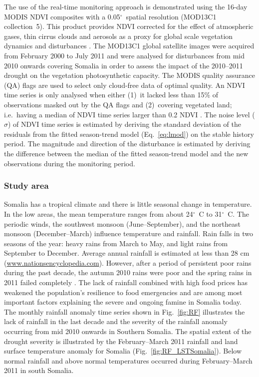\documentclass[authoryear,preprint,review,10pt]{elsarticle}
\newcommand{\degree}{\ensuremath{^\circ}}
\begin{document}
The use of the real-time monitoring approach is demonstrated using the 16-day MODIS NDVI composites with a 0.05\degree \ spatial resolution (MOD13C1 collection~5). This product provides  NDVI corrected for the effect of atmospheric gases, thin cirrus clouds and aerosols as a proxy for global scale vegetation dynamics and disturbances \citep{Huete2002}.
The MOD13C1 global satellite images were acquired from February 2000 to July 2011 and were analysed for disturbances from mid 2010 onwards covering Somalia
in order to assess the impact of the 2010--2011 drought on the vegetation photosynthetic capacity. The MODIS quality assurance (QA) flags are used to select
only cloud-free data of optimal quality. An NDVI time series is only analysed when either (1)~it lacked less than 15\% of observations masked out by the QA
flags and (2)~covering vegetated land; i.e.\ having a median of NDVI time series larger than 0.2 NDVI \citep{Beurs2009, deJong:wo, Vrieling:2011da}. The
noise level ($\sigma$) of NDVI time series is estimated by deriving the standard deviation of the residuals from the fitted season-trend model
(Eq.~\ref{eq:lmod}) on the stable history period.  The magnitude and direction of the disturbance is estimated by deriving the difference between the median
of the fitted season-trend model and the new observations during the monitoring period.

\subsubsection*{Study area}

Somalia has a tropical climate and there is little seasonal change in temperature. In the low areas, the mean temperature ranges from about 24\degree~C to 31\degree~C. The periodic winds, the southwest monsoon (June--September), and the northeast monsoon (December--March) influence temperature and rainfall. Rain falls in two seasons of the year: heavy rains from March to May, and light rains from September to December. Average annual rainfall is estimated at less than 28 cm (\url{www.nationsencyclopedia.com}).  However, after a period of persistent poor rains during the past decade, the autumn 2010 rains were poor and the spring rains in 2011 failed completely \citep{Funk:2011fg}. The lack of rainfall combined with high food prices has weakened the population's resilience to food emergencies and are among most important factors explaining the severe and ongoing famine in Somalia today. The monthly rainfall anomaly time series shown in Fig.~\ref{fig:RF} illustrates the lack of rainfall in the last decade and the severity of the rainfall anomaly occurring from mid 2010 onwards in Southern Somalia. The spatial extent of the drought severity is illustrated by the February--March 2011 rainfall \citep{Xie:1997tw} and land surface temperature anomaly for Somalia (Fig.~\ref{fig:RF_LSTSomalia}). Below normal rainfall and above normal temperatures occurred during February--March 2011 in south Somalia.
\end{document}
